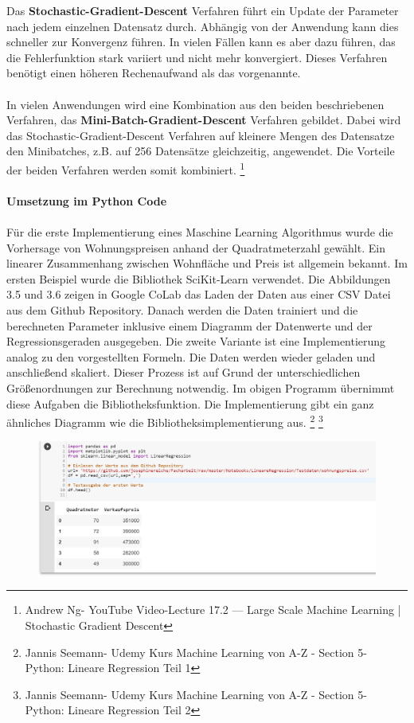 \documentclass[a4paper]{scrreprt}
\begin{document}
\begin{enumerate}
Das \textbf{Stochastic-Gradient-Descent} Verfahren führt ein Update der Parameter nach jedem einzelnen Datensatz durch. Abhängig von der Anwendung kann dies schneller zur Konvergenz führen. In vielen Fällen kann es aber dazu führen, das die Fehlerfunktion stark variiert und nicht mehr konvergiert. Dieses Verfahren benötigt einen höheren Rechenaufwand als das vorgenannte.\\\\
In vielen Anwendungen wird eine Kombination aus den beiden beschriebenen Verfahren, das \textbf{Mini-Batch-Gradient-Descent} Verfahren gebildet. Dabei wird das Stochastic-Gradient-Descent Verfahren auf kleinere Mengen des Datensatze den Minibatches, z.B. auf 256 Datensätze gleichzeitig, angewendet. Die Vorteile der beiden Verfahren werden somit kombiniert.
\footnote{Andrew Ng- YouTube Video-Lecture 17.2 — Large Scale Machine Learning | Stochastic Gradient Descent}
\\\\
\textbf{Umsetzung im Python Code}\\\\
%
Für die erste Implementierung eines Maschine Learning Algorithmus wurde die Vorhersage von Wohnungspreisen anhand der Quadratmeterzahl gewählt. Ein linearer Zusammenhang zwischen Wohnfläche und Preis ist allgemein bekannt. Im ersten Beispiel wurde die Bibliothek SciKit-Learn verwendet. Die Abbildungen 3.5 und 3.6 zeigen in Google CoLab das Laden der Daten aus einer CSV Datei aus dem Github Repository. Danach werden die Daten trainiert und die berechneten Parameter inklusive einem Diagramm der Datenwerte und der Regressionsgeraden ausgegeben.\newpage
Die zweite Variante ist eine Implementierung analog zu den vorgestellten Formeln. Die Daten werden wieder geladen und anschließend skaliert. Dieser Prozess ist auf Grund der unterschiedlichen Größenordnungen zur Berechnung notwendig. Im obigen Programm übernimmt diese Aufgaben die Bibliotheksfunktion. Die Implementierung gibt ein ganz ähnliches Diagramm wie die Bibliotheksimplementierung aus.
\footnote{Jannis Seemann- Udemy Kurs Machine Learning von A-Z - Section 5- Python: Lineare Regression Teil 1}
\footnote{Jannis Seemann- Udemy Kurs Machine Learning von A-Z - Section 5- Python: Lineare Regression Teil 2}
\newline
%
\begin{figure}[hp]
\centering
\includegraphics[scale=.75]{Abbildungen/Lineare_Regression_Python_1}

\end{figure}
\end{enumerate}
\end{document}
